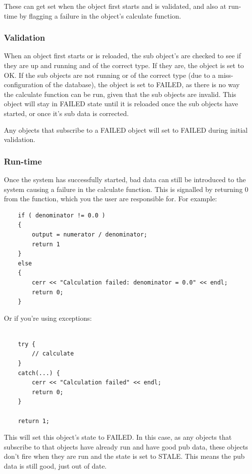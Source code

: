 \documentclass{report}
\begin{document}
These can get set when the object first starts and is validated, and also at run-time by flagging a failure in the object's calculate function.

\subsubsection{Validation}

When an object first starts or is reloaded, the sub object's are checked to see if they are up and running and of the correct type. If they are, the object is set to OK. If the sub objects are not running or of the correct type (due to a miss-configuration of the database), the object is set to FAILED, as there is no way the calculate function can be run, given that the sub objects are invalid. This object will stay in FAILED state until it is reloaded once the sub objects have started, or once it's sub data is corrected.

Any objects that subscribe to a FAILED object will set to FAILED during initial validation. 

\subsubsection{Run-time}

Once the system has successfully started, bad data can still be introduced to the system causing a failure in the calculate function. This is signalled by returning 0 from the function, which you the user are responsible for. For example:

\begin{verbatim}
    if ( denominator != 0.0 )
    {
        output = numerator / denominator;
        return 1
    }
    else
    {
        cerr << "Calculation failed: denominator = 0.0" << endl;
        return 0;   
    }
\end{verbatim}

Or if you're using exceptions:

\begin{verbatim}

    try {
        // calculate
    }
    catch(...) {
        cerr << "Calculation failed" << endl;
        return 0;
    }
    
    return 1;
\end{verbatim}

This will set this object's state to FAILED. In this case, as any objects that subscribe to that objects have already run and have good pub data, these objects don't fire when they are run and the state is set to STALE. This means the pub data is still good, just out of date.
\end{document}
